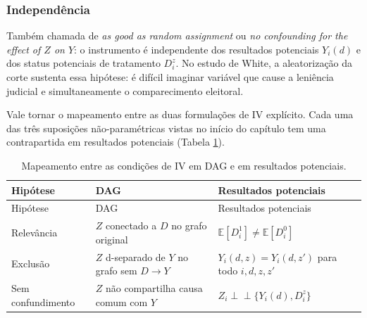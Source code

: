 \documentclass[
]{article}
\begin{document}
\subsubsection{Independência}\label{independuxeancia}

Também chamada de \emph{as good as random assignment} ou \emph{no confounding for the effect of \(Z\) on \(Y\)}: o instrumento é independente dos resultados potenciais \(Y_i(d)\) e dos status potenciais de tratamento \(D^z_i\). No estudo de White, a aleatorização da corte sustenta essa hipótese: é difícil imaginar variável que cause a leniência judicial e simultaneamente o comparecimento eleitoral.

Vale tornar o mapeamento entre as duas formulações de IV explícito. Cada uma das três suposições não-paramétricas vistas no início do capítulo tem uma contrapartida em resultados potenciais (Tabela \ref{tab:dag-vs-po}).

\begin{longtable}[]{@{}
  >{\raggedright\arraybackslash}p{}
  >{\raggedright\arraybackslash}p{}
  >{\raggedright\arraybackslash}p{}@{}}
\caption{\label{tab:dag-vs-po} Mapeamento entre as condições de IV em DAG e em resultados potenciais.}\tabularnewline
\toprule\noalign{}
\begin{minipage}[b]{\linewidth}\raggedright
Hipótese
\end{minipage} & \begin{minipage}[b]{\linewidth}\raggedright
DAG
\end{minipage} & \begin{minipage}[b]{\linewidth}\raggedright
Resultados potenciais
\end{minipage} \\
\midrule\noalign{}
\endfirsthead
\toprule\noalign{}
\begin{minipage}[b]{\linewidth}\raggedright
Hipótese
\end{minipage} & \begin{minipage}[b]{\linewidth}\raggedright
DAG
\end{minipage} & \begin{minipage}[b]{\linewidth}\raggedright
Resultados potenciais
\end{minipage} \\
\midrule\noalign{}
\endhead
\bottomrule\noalign{}
\endlastfoot
Relevância & \(Z\) conectado a \(D\) no grafo original & \(\mathbb{E}[D^1_i] \neq \mathbb{E}[D^0_i]\) \\
Exclusão & \(Z\) d-separado de \(Y\) no grafo sem \(D \to Y\) & \(Y_i(d, z) = Y_i(d, z')\) para todo \(i, d, z, z'\) \\
Sem confundimento & \(Z\) não compartilha causa comum com \(Y\) & \(Z_i \perp\!\!\!\perp \{Y_i(d), D^z_i\}\) \\
\end{longtable}
\end{document}
